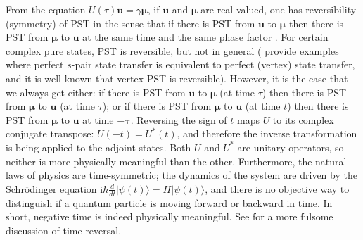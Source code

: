 \documentclass{article}
\numberwithin{equation}{section}
\newcommand{\bu}{\mathbf u}
\newcommand{\bmu}{{\boldsymbol{\mu}}}
\def\ii{\mathrm{i}}
\begin{document}
{From the equation $U(\tau)\bu=\gamma\bmu$, if $\bu$ and $\bmu$ are real-valued, one has reversibility (symmetry) of PST in the sense that if there is PST from $\bu$ to $\bmu$ then there is PST from $\bmu$ to $\bu$ at the same time and the same phase factor \cite[Cor 5.3]{godsil2017real}. For certain complex pure states, PST is reversible, but not in general  (\cite{kim2024generalization} provide examples where perfect $s$-pair state transfer is equivalent to perfect (vertex) state transfer, and it is well-known that vertex PST is reversible). However, it is the case that we always get  either: if there is PST from $\bu$ to $\bmu$  (at time $\tau$) then there is PST from $\overline{\bmu}$ to $\overline{\bu}$ (at time $\tau$); or if there is PST from $\bmu$ to $\bu$ (at time $t$) then there is PST from $\bmu$ to $\bu$  at time $\mathbf{-\tau}$. Reversing the sign of $t$ maps $U$ to its complex conjugate transpose: $U(-t)=U^*(t)$, and therefore the inverse transformation is being applied to the adjoint states. Both $U$ and $U^*$ are unitary operators, so neither is more physically meaningful than the other. Furthermore, the natural laws of physics are time-symmetric; the dynamics of the system are driven by the Schr\"{o}dinger equation 
\(\ii\hbar \frac{d}{dt} \vert{}\psi(t)\rangle = H \vert{}\psi(t)\rangle\), and there is no objective way to distinguish if a quantum particle is moving forward or backward in time. In short, negative time is indeed physically meaningful. See \cite{hoover2012time, sachs1987physics} for a more fulsome  discussion of time reversal.

}
\end{document}
